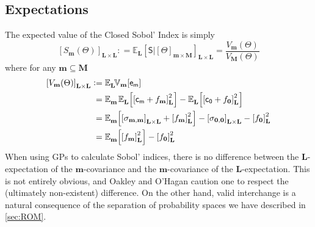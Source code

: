 \documentclass[preprint,12pt]{elsarticle}
\newcommand*{\M}[1]{\ensuremath{#1}\xspace}
\newcommand*{\x}{\times}
\newcommand*{\mi}[1]{\mathbf{#1}}
\newcommand*{\rv}[1]{\mathsf{#1}}
\newcommand*{\te}[2][]{\left\lbrack{#2}\right\rbrack_{#1}}
\newcommand*{\deq}{\M{\mathrel{\mathop:}=}}
\newcommand*{\ev}[3][]{\mathbb{E}_{#3}^{#1}\!\left\lbrack{#2}\right\rbrack}
\newcommand*{\evt}[3][]{\mathbb{E}_{#3}^{#1}\!#2}
\newcommand*{\cov}[3][]{\ifthenelse{\equal{#1}{}}{\mathbb{V}_{#3}\!\left\lbrack{#2}\right\rbrack}{\mathbb{V}_{#3}\!\left\lbrack{#2,#1}\right\rbrack}}
\begin{document}
        \subsection{Expectations} \label{sub:Sobol:Expectations}
            The expected value of the Closed Sobol' Index is simply
            \begin{equation*}
                \te[\mi{L}\x\mi{L}]{S_\mi{m}(\Theta)} \deq 
                \evt{\te[\mi{L}\x\mi{L}]{\rv{S} \big\vert \te[\mi{m}\x\mi{M}]{\Theta}}}{\mi{L}} =
                \frac
                {V_{\mi{m}}(\Theta)}
                {V_{\mi{M}}(\Theta)}
            \end{equation*}
            where for any $\mi{m}\subseteq\mi{M}$
            \begin{equation*}
                \begin{aligned}
                    \te[\mi{L\x L}]{V_{\mi{m}}(\Theta)} &\deq \evt{\cov{\rv{e_{m}}}{\mi{m}}}{\mi{L}} \\
                    &\phantom{:}= \evt{\;\ev{\te[\mi{L}]{\rv{c_{m}} + f_{\mi{m}}}^{2}}{\mi{L}}}{\mi{m}} - \ev{\te[\mi{L}]{\rv{c_{0}} + f_{\mi{0}}}^{2}}{\mi{L}} \\
                    &\phantom{:}= \ev{\te[\mi{L\x L}]{\sigma_{\mi{m,m}}} + \te[\mi{L}]{f_{\mi{m}}}^{2}}{\mi{m}} - \te[\mi{L\x L}]{\sigma_{\mi{0,0}}} - \te[\mi{L}]{f_{\mi{0}}}^{2}\\
                    &\phantom{:}= \ev{\te[\mi{L}]{f_{\mi{m}}}^{2}}{\mi{m}} - \te[\mi{L}]{f_{\mi{0}}}^{2}
                \end{aligned}
            \end{equation*}
            When using GPs to calculate Sobol' indices, there is no difference between the $\mi{L}$-expectation of the $\mi{m}$-covariance and the $\mi{m}$-covariance of the $\mi{L}$-expectation. This is not entirely obvious, and Oakley and O'Hagan \cite{Oakley.OHagan2004} caution one to respect the (ultimately non-existent) difference. On the other hand, valid interchange is a natural consequence of the separation of probability spaces we have described in \cref{sec:ROM}.
\end{document}
